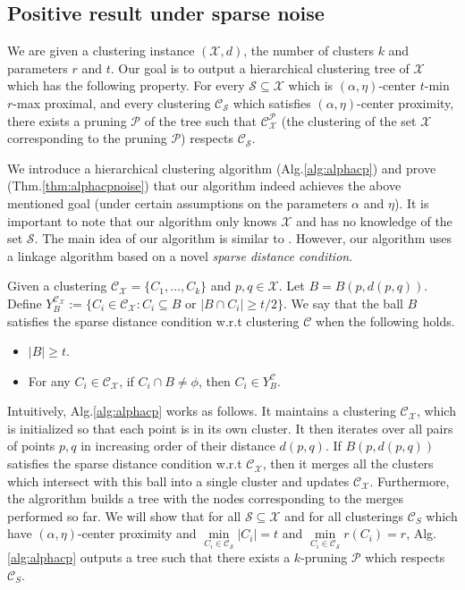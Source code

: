 \documentclass[anon,12pt]{colt2016} %
\newcommand{\mc}{\mathcal}
\begin{document}
\subsection{Positive result under sparse noise}
\label{section:positiveResultSparseNoise}
We are given a clustering instance $(\mc X, d)$, the number of clusters $k$ and parameters $r$ and $t$. Our goal is to output a hierarchical clustering tree of $\mc X$ which has the following property. For every $\mc S \subseteq \mc X$ which is $(\alpha, \eta)$-center $t$-min $r$-max proximal, and every clustering $\mc C_{\mc S}$ which satisfies $(\alpha, \eta)$-center proximity, there exists a pruning $\mc P$ of the tree such that $\mc C_{\mc X}^{\mc P}$ (the clustering of the set $\mc X$ corresponding to the pruning $\mc P$) respects $\mc C_{\mc S}$. 

We introduce a hierarchical clustering algorithm (Alg.\ref{alg:alphacp}) and prove (Thm.\ref{thm:alphacpnoise}) that our algorithm indeed achieves the above mentioned goal (under certain assumptions on the parameters $\alpha$ and $\eta$). It is important to note that our algorithm only knows $\mc X$ and has no knowledge of the set $\mc S$. The main idea of our algorithm is similar to \cite{balcan2012clustering}. However, our algorithm uses a linkage algorithm based on a novel {\it sparse distance condition}.

\begin{definition}
	 Given a clustering $\mc C_{\mc X}=\{C_1,\ldots,C_k\}$ and $p, q \in \mc X$. Let $B = B(p, d(p, q))$. Define $Y_B^{\mc C_{\mc X}} := \{C_i \in \mc C_{\mc X} : C_i \subseteq B \text{ or } |B \cap C_i| \ge t/2\}$. 
We say that the ball $B$ satisfies the sparse distance condition w.r.t clustering $\mc C$ when the following holds.
\begin{itemize}[noitemsep, leftmargin=*]
\item $|B| \ge t$.
\item For any $C_i \in \mc C_{\mc X}$, if $C_i \cap B \neq \phi$, then $C_i \in Y_B^{\mc C}$.
\end{itemize}
\end{definition}

Intuitively, Alg.\ref{alg:alphacp} works as follows. It maintains a clustering $\mc C_{\mc X}$, which is initialized so that  each point is in its own cluster. It then iterates over all pairs of points $p, q$ in increasing order of their distance $d(p, q)$. If $B(p, d(p,q))$ satisfies the sparse distance condition w.r.t $\mc C_{\mc X}$, then it merges all the clusters which intersect with this ball into a single cluster and updates $\mc C_{\mc X}$. Furthermore, the algrorithm builds a tree with the nodes corresponding to the merges performed so far. We will show that for all $\mc S \subseteq \mc X$ and for all clusterings $\mc C_S$ which have $(\alpha, \eta)$-center proximity and $\min\limits_{C_i \in {\mc C}_{\mc S}} |C_i| = t$ and $\min\limits_{C_i \in {\mc C}_{\mc S}} r(C_i) = r$, Alg. \ref{alg:alphacp} outputs a tree such that there exists a $k$-pruning $\mc P$ which respects $\mc C_S$. %
\end{document}
